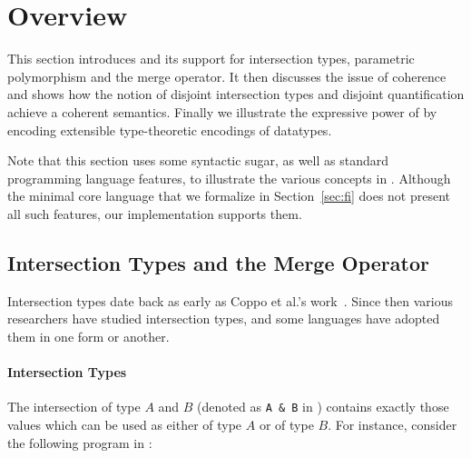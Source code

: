 \section{Overview} \label{sec:overview}

This section introduces \name and its support for intersection types,
parametric polymorphism and the merge operator. It then discusses
the issue of coherence and shows how the notion of disjoint
intersection types and disjoint quantification achieve a coherent semantics.
Finally we illustrate the expressive power of \name by encoding
extensible type-theoretic encodings of datatypes.

Note that this section uses some syntactic sugar, as well as standard
programming language features, to illustrate the various concepts in
\name. Although the minimal core language that we formalize in
Section~\ref{sec:fi} does not present all such features, our implementation
supports them.



\begin{comment}
It then shows that,
with unrestricted intersection types, the system
lacks \emph{coherence}. This motivates the introduction of
disjoint intersection types and extending universal quatification to
disjoint quantification, which is enough to ensure coherence.
\end{comment}

\subsection{Intersection Types and the Merge Operator}

Intersection types date back as early as Coppo et
al.'s work~\cite{coppo1981functional}. Since then various researchers have
studied intersection types, and some languages have adopted them in one
form or another.

\paragraph{Intersection Types}
The intersection of type $A$ and $B$ (denoted as \lstinline{A & B} in
\name) contains exactly those values
which can be used as either of type $A$ or of type $B$. For instance,
consider the following program in \name:

